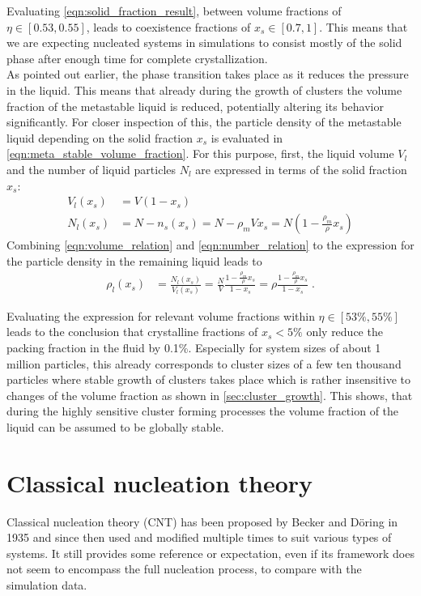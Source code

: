 Evaluating \autoref{eqn:solid_fraction_result}, between volume fractions of $\eta \in [0.53,0.55]$, leads to coexistence fractions of $x_s \in [0.7,1]$. This means that we are expecting nucleated systems in simulations to consist mostly of the solid phase after enough time for complete crystallization.\\

As pointed out earlier, the phase transition takes place as it reduces the pressure in the liquid. This means that already during the growth of clusters the volume fraction of the metastable liquid is reduced, potentially altering its behavior significantly. For closer inspection of this, the particle density of the metastable liquid depending on the solid fraction $x_s$ is evaluated in \autoref{eqn:meta_stable_volume_fraction}. For this purpose, first, the liquid volume $V_l$ and the number of liquid particles $N_l$ are expressed in terms of the solid fraction $x_s$:
\begin{align}
\label{eqn:volume_relation}
V_l(x_s) & = V(1-x_s)\\
\label{eqn:number_relation}
N_l(x_s) & = N-n_s(x_s) = N - \rho_m V x_s = N(1-\frac{\rho_m}{\rho}x_s)
\end{align}
Combining \autoref{eqn:volume_relation} and \autoref{eqn:number_relation} to the expression for the particle density in the remaining liquid leads to
\begin{align}
\label{eqn:meta_stable_volume_fraction}
\rho_l(x_s) &= \frac{N_l (x_s) }{ V_l(x_s) } = \frac{N}{V} \frac{1-\frac{\rho_m}{\rho}x_s}{1-x_s} = \rho \frac{1-\frac{\rho_m}{\rho}x_s}{1-x_s} \; \text{.}
\end{align}
 
Evaluating the expression for relevant volume fractions within $\eta \in [53\%, 55\%]$ leads to the conclusion that crystalline fractions of $x_s < 5\%$ only reduce the packing fraction in the fluid by 0.1\%. Especially for system sizes of about 1 million particles, this already corresponds to cluster sizes of a few ten thousand particles where stable growth of clusters takes place which is rather insensitive to changes of the volume fraction as shown in \autoref{sec:cluster_growth}. This shows, that during the highly sensitive cluster forming processes the volume fraction of the liquid can be assumed to be globally stable.

\section{Classical nucleation theory }
\label{sec:CNT}
Classical nucleation theory (CNT) has been proposed by Becker and Döring in 1935\cite{Becker1935} and since then used and modified multiple times to suit various types of systems. It still provides some reference or expectation, even if its framework does not seem to encompass the full nucleation process, to compare with the simulation data.\\

